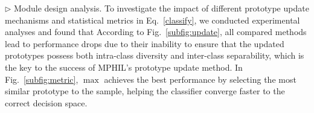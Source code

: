 
\noindent$\rhd$ \textsf{Module design analysis.}
To investigate the impact of different prototype update mechanisms and statistical metrics in Eq.~\eqref{classify}, we conducted experimental analyses and found that  According to Fig.~\ref{subfig:update}, all compared methods lead to performance drops due to their inability to ensure that the updated prototypes possess both intra-class diversity and inter-class separability, which is the key to the success of MPHIL's prototype update method.  In Fig.~\ref{subfig:metric}, $\max$ achieves the best performance by selecting the most similar prototype to the sample, helping the classifier converge faster to the correct decision space.




